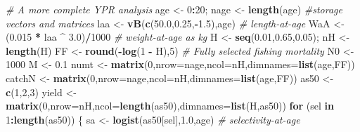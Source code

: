 \documentclass[
  lang=cn,
  11pt,
  scheme=chinese,
  chinesefont=nofont,
  citestyle=gb7714-2015,
  bibstyle=gb7714-2015]{elegantbook}
\newenvironment{Shaded}{\begin{snugshade}}{\end{snugshade}}
\newcommand{\AttributeTok}[1]{\textcolor[rgb]{0.13,0.29,0.53}{#1}}
\newcommand{\CommentTok}[1]{\textcolor[rgb]{0.56,0.35,0.01}{\textit{#1}}}
\newcommand{\ControlFlowTok}[1]{\textcolor[rgb]{0.13,0.29,0.53}{\textbf{#1}}}
\newcommand{\DecValTok}[1]{\textcolor[rgb]{0.00,0.00,0.81}{#1}}
\newcommand{\FloatTok}[1]{\textcolor[rgb]{0.00,0.00,0.81}{#1}}
\newcommand{\FunctionTok}[1]{\textcolor[rgb]{0.13,0.29,0.53}{\textbf{#1}}}
\newcommand{\NormalTok}[1]{#1}
\newcommand{\OtherTok}[1]{\textcolor[rgb]{0.56,0.35,0.01}{#1}}
\newcommand{\SpecialCharTok}[1]{\textcolor[rgb]{0.81,0.36,0.00}{\textbf{#1}}}
\begin{document}
\begin{Shaded}
\begin{Highlighting}[]
\CommentTok{\# A more complete YPR analysis  }
\NormalTok{age }\OtherTok{\textless{}{-}} \DecValTok{0}\SpecialCharTok{:}\DecValTok{20}\NormalTok{;  nage }\OtherTok{\textless{}{-}} \FunctionTok{length}\NormalTok{(age) }\CommentTok{\#storage vectors and matrices  }
\NormalTok{laa }\OtherTok{\textless{}{-}} \FunctionTok{vB}\NormalTok{(}\FunctionTok{c}\NormalTok{(}\FloatTok{50.0}\NormalTok{,}\FloatTok{0.25}\NormalTok{,}\SpecialCharTok{{-}}\FloatTok{1.5}\NormalTok{),age) }\CommentTok{\# length{-}at{-}age  }
\NormalTok{WaA }\OtherTok{\textless{}{-}}\NormalTok{ (}\FloatTok{0.015} \SpecialCharTok{*}\NormalTok{ laa }\SpecialCharTok{\^{}} \FloatTok{3.0}\NormalTok{)}\SpecialCharTok{/}\DecValTok{1000}  \CommentTok{\# weight{-}at{-}age as kg  }
\NormalTok{H }\OtherTok{\textless{}{-}} \FunctionTok{seq}\NormalTok{(}\FloatTok{0.01}\NormalTok{,}\FloatTok{0.65}\NormalTok{,}\FloatTok{0.05}\NormalTok{);  nH }\OtherTok{\textless{}{-}} \FunctionTok{length}\NormalTok{(H)     }
\NormalTok{FF }\OtherTok{\textless{}{-}} \FunctionTok{round}\NormalTok{(}\SpecialCharTok{{-}}\FunctionTok{log}\NormalTok{(}\DecValTok{1} \SpecialCharTok{{-}}\NormalTok{ H),}\DecValTok{5}\NormalTok{)  }\CommentTok{\# Fully selected fishing mortality  }
\NormalTok{N0 }\OtherTok{\textless{}{-}} \DecValTok{1000}  
\NormalTok{M }\OtherTok{\textless{}{-}} \FloatTok{0.1}  
\NormalTok{numt }\OtherTok{\textless{}{-}} \FunctionTok{matrix}\NormalTok{(}\DecValTok{0}\NormalTok{,}\AttributeTok{nrow=}\NormalTok{nage,}\AttributeTok{ncol=}\NormalTok{nH,}\AttributeTok{dimnames=}\FunctionTok{list}\NormalTok{(age,FF))  }
\NormalTok{catchN }\OtherTok{\textless{}{-}} \FunctionTok{matrix}\NormalTok{(}\DecValTok{0}\NormalTok{,}\AttributeTok{nrow=}\NormalTok{nage,}\AttributeTok{ncol=}\NormalTok{nH,}\AttributeTok{dimnames=}\FunctionTok{list}\NormalTok{(age,FF))  }
\NormalTok{as50 }\OtherTok{\textless{}{-}} \FunctionTok{c}\NormalTok{(}\DecValTok{1}\NormalTok{,}\DecValTok{2}\NormalTok{,}\DecValTok{3}\NormalTok{)    }
\NormalTok{yield }\OtherTok{\textless{}{-}} \FunctionTok{matrix}\NormalTok{(}\DecValTok{0}\NormalTok{,}\AttributeTok{nrow=}\NormalTok{nH,}\AttributeTok{ncol=}\FunctionTok{length}\NormalTok{(as50),}\AttributeTok{dimnames=}\FunctionTok{list}\NormalTok{(H,as50))  }
\ControlFlowTok{for}\NormalTok{ (sel }\ControlFlowTok{in} \DecValTok{1}\SpecialCharTok{:}\FunctionTok{length}\NormalTok{(as50)) \{  }
\NormalTok{   sa }\OtherTok{\textless{}{-}} \FunctionTok{logist}\NormalTok{(as50[sel],}\FloatTok{1.0}\NormalTok{,age)  }\CommentTok{\# selectivity{-}at{-}age  }

\end{Highlighting}
\end{Shaded}
\end{document}

